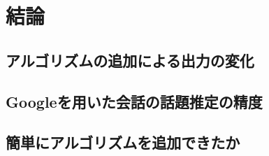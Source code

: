 
\section{結論}
\subsection{アルゴリズムの追加による出力の変化}
\subsection{Googleを用いた会話の話題推定の精度}
\subsection{簡単にアルゴリズムを追加できたか}

